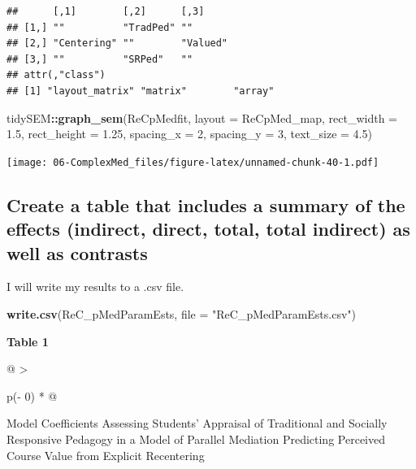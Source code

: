 \documentclass[
  11pt,
]{book}
\newenvironment{Shaded}{\begin{snugshade}}{\end{snugshade}}
\newcommand{\AttributeTok}[1]{\textcolor[rgb]{0.27,0.27,0.27}{#1}}
\newcommand{\DecValTok}[1]{\textcolor[rgb]{0.06,0.06,0.06}{#1}}
\newcommand{\FloatTok}[1]{\textcolor[rgb]{0.06,0.06,0.06}{#1}}
\newcommand{\FunctionTok}[1]{\textcolor[rgb]{0.27,0.27,0.27}{\textbf{#1}}}
\newcommand{\NormalTok}[1]{#1}
\newcommand{\SpecialCharTok}[1]{\textcolor[rgb]{0.43,0.43,0.43}{\textbf{#1}}}
\newcommand{\StringTok}[1]{\textcolor[rgb]{0.5,0.5,0.5}{#1}}
\begin{document}
\begin{verbatim}
##      [,1]        [,2]      [,3]    
## [1,] ""          "TradPed" ""      
## [2,] "Centering" ""        "Valued"
## [3,] ""          "SRPed"   ""      
## attr(,"class")
## [1] "layout_matrix" "matrix"        "array"
\end{verbatim}

\begin{Shaded}
\begin{Highlighting}[]
\NormalTok{tidySEM}\SpecialCharTok{::}\FunctionTok{graph\_sem}\NormalTok{(ReCpMedfit, }\AttributeTok{layout =}\NormalTok{ ReCpMed\_map, }\AttributeTok{rect\_width =} \FloatTok{1.5}\NormalTok{,}
    \AttributeTok{rect\_height =} \FloatTok{1.25}\NormalTok{, }\AttributeTok{spacing\_x =} \DecValTok{2}\NormalTok{, }\AttributeTok{spacing\_y =} \DecValTok{3}\NormalTok{, }\AttributeTok{text\_size =} \FloatTok{4.5}\NormalTok{)}
\end{Highlighting}
\end{Shaded}

\texttt{[image: 06-ComplexMed\_files/figure-latex/unnamed-chunk-40-1.pdf]}

\hypertarget{create-a-table-that-includes-a-summary-of-the-effects-indirect-direct-total-total-indirect-as-well-as-contrasts}{%
\subsection*{Create a table that includes a summary of the effects (indirect, direct, total, total indirect) as well as contrasts}\label{create-a-table-that-includes-a-summary-of-the-effects-indirect-direct-total-total-indirect-as-well-as-contrasts}}


I will write my results to a .csv file.

\begin{Shaded}
\begin{Highlighting}[]
\FunctionTok{write.csv}\NormalTok{(ReC\_pMedParamEsts, }\AttributeTok{file =} \StringTok{"ReC\_pMedParamEsts.csv"}\NormalTok{)}
\end{Highlighting}
\end{Shaded}

\textbf{Table 1}

\begin{longtable}[]{@{}
  >{\raggedright\arraybackslash}p{(\columnwidth - 0\tabcolsep) * }@{}}
\toprule\noalign{}
\begin{minipage}[b]{\linewidth}\raggedright
Model Coefficients Assessing Students' Appraisal of Traditional and Socially Responsive Pedagogy in a Model of Parallel Mediation Predicting Perceived Course Value from Explicit Recentering
\end{minipage} \\
\midrule\noalign{}
\endhead
\bottomrule\noalign{}
\endlastfoot
\end{longtable}
\end{document}
